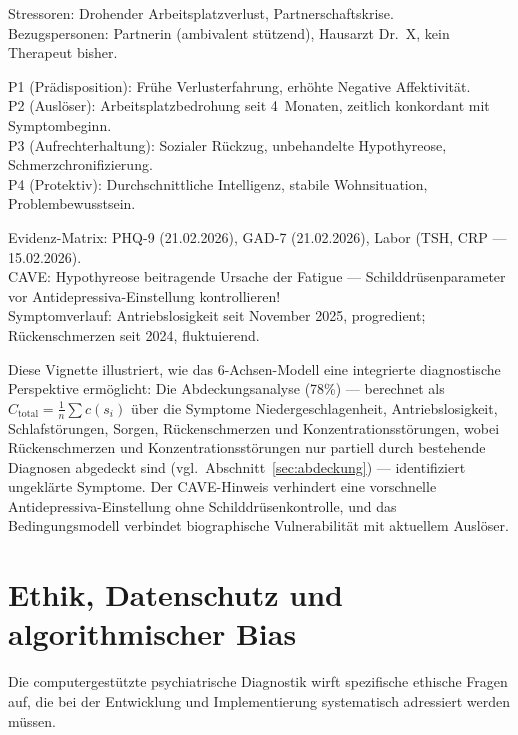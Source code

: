 \documentclass[11pt,a4paper]{article}
\begin{document}
\begin{description}[style=nextline, leftmargin=1.5cm, font=\bfseries\small]
Stressoren: Drohender Arbeitsplatzverlust, Partnerschaftskrise. \\
Bezugspersonen: Partnerin (ambivalent st\"utzend), Hausarzt Dr.~X, kein Therapeut bisher.
\item[Achse~V (Bedingungsmodell)]
P1 (Pr\"adisposition): Fr\"uhe Verlusterfahrung, erh\"ohte Negative Affektivit\"at. \\
P2 (Ausl\"oser): Arbeitsplatzbedrohung seit 4~Monaten, zeitlich konkordant mit Symptombeginn. \\
P3 (Aufrechterhaltung): Sozialer R\"uckzug, unbehandelte Hypothyreose, Schmerzchronifizierung. \\
P4 (Protektiv): Durchschnittliche Intelligenz, stabile Wohnsituation, Problembewusstsein.
\item[Achse~VI (Belegsammlung)]
Evidenz-Matrix: PHQ-9 (21.02.2026), GAD-7 (21.02.2026), Labor (TSH, CRP --- 15.02.2026). \\
CAVE: Hypothyreose beitragende Ursache der Fatigue --- Schilddr\"usenparameter vor Antidepressiva-Einstellung kontrollieren! \\
Symptomverlauf: Antriebslosigkeit seit November 2025, progredient; R\"uckenschmerzen seit 2024, fluktuierend.
\end{description}

\noindent Diese Vignette illustriert, wie das 6-Achsen-Modell eine integrierte diagnostische Perspektive erm\"oglicht: Die Abdeckungsanalyse (78\%) --- berechnet als $C_{\text{total}} = \frac{1}{n} \sum c(s_i)$ \"uber die Symptome Niedergeschlagenheit, Antriebslosigkeit, Schlafst\"orungen, Sorgen, R\"uckenschmerzen und Konzentrationsst\"orungen, wobei R\"uckenschmerzen und Konzentrationsst\"orungen nur partiell durch bestehende Diagnosen abgedeckt sind (vgl.\ Abschnitt~\ref{sec:abdeckung}) --- identifiziert ungekl\"arte Symptome. Der CAVE-Hinweis verhindert eine vorschnelle Antidepressiva-Einstellung ohne Schilddr\"usenkontrolle, und das Bedingungsmodell verbindet biographische Vulnerabilit\"at mit aktuellem Ausl\"oser.


\section{Ethik, Datenschutz und algorithmischer Bias}
\label{sec:ethik}

Die computergest\"utzte psychiatrische Diagnostik wirft spezifische ethische Fragen auf, die bei der Entwicklung und Implementierung systematisch adressiert werden m\"ussen.
\end{document}
